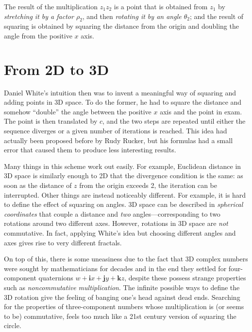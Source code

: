 \documentclass{article}
\let\vec\mathbf
\begin{document}
\noindent
The result of the multiplication $z_1 z_2$ is a point that is obtained
from $z_1$ by \emph{stretching it by a factor $\rho_2$}, and
then \emph{rotating it by an angle $\theta_2$}; and the result of
squaring is obtained by squaring the distance from the origin and
doubling the angle from the positive $x$ axis.

\section{From 2D to 3D}
\label{sec:2d-3d}

Daniel White's intuition then was to invent a meaningful way of squaring
and adding points in 3D space.  To do the former, he had to square
the distance and somehow ``double'' the angle between the positive $x$
axis and the point in exam.  The point is then translated by $c$, and
the two steps are repeated until either the sequence diverges or a given
number of iterations is reached.  This idea had actually been proposed
before by Rudy Rucker, but his formulas had a small error that caused
them to produce less interesting results.

Many things in this scheme work out easily.  For example, Euclidean
distance in 3D space is similarly enough to 2D that the divergence
condition is the same: as soon as the distance of $z$ from the origin
exceeds 2, the iteration can be interrupted.  Other things are instead
noticeably different.  For example, it is hard to define the effect of
squaring on angles.  3D space can be described in \emph{spherical
  coordinates} that couple a distance and \emph{two}
angles---corresponding to two rotations around two different axes.
However, rotations in 3D space are \emph{not} commutative.  In fact,
applying White's idea but choosing different angles and axes gives
rise to very different fractals.

On top of this, there is some uneasiness due to the fact that 3D
complex numbers were sought by mathematicians for decades and in the
end they settled for four-component quaternions
$w+\vec{i}x+\vec{j}y+\vec{k}z$, despite these possess strange
properties such as \emph{noncommutative multiplication}.  The infinite
possible ways to define the 3D rotation give the feeling of banging
one's head against dead ends.  Searching for the properties of
three-component numbers whose multiplication is (or seems to be)
commutative, feels too much like a 21st century version of squaring
the circle.
\end{document}
